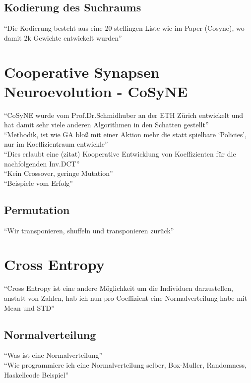         \subsection{Kodierung des Suchraums}
            ``Die Kodierung besteht aus eine 20-stellingen Liste wie im Paper (Cosyne), wo damit 2k Gewichte entwickelt wurden''

    \section{Cooperative Synapsen Neuroevolution - CoSyNE}
        ``CoSyNE wurde vom Prof.Dr.Schmidhuber an der ETH Zürich entwickelt und hat damit sehr viele anderen Algorithmen in den Schatten gestellt''\\
        ``Methodik, ist wie GA bloß mit einer Aktion mehr die statt spielbare `Policies', nur im Koeffizientraum entwickle'' \\
        ``Dies erlaubt eine (zitat) Kooperative Entwicklung von Koeffizienten für die nachfolgenden Inv.DCT'' \\
        ``Kein Crossover, geringe Mutation'' \\
        ``Beispiele vom Erfolg'' \\
        \subsection{Permutation}
            ``Wir transponieren, shuffeln und transponieren zurück''

    \section{Cross Entropy}
        ``Cross Entropy ist eine andere Möglichkeit um die Individuen darzustellen, anstatt von Zahlen, hab ich nun pro Coeffizient eine Normalverteilung habe mit Mean und STD'' \\
        \cite{boer05}

        \subsection{Normalverteilung}
            ``Was ist eine Normalverteilung'' \\
            ``Wie programmiere ich eine Normalverteilung selber, Box-Muller, Randomness, Haskellcode Beispiel'' \\

